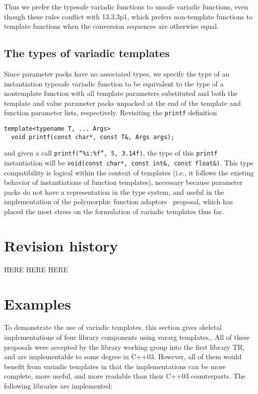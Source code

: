\documentclass{article}
\begin{document}
Thus we prefer the typesafe variadic functions to unsafe variadic
functions, even though these rules conflict with 13.3.3p1, which
prefers non-template functions to template functions when the
conversion sequences are otherwise equal.

\subsection{The types of variadic templates}
Since parameter packs have no associated types, we specify the
type of an instantiation typesafe variadic function to be equivalent
to the type of a nontemplate function with all template parameters
substituted and both the template and value parameter packs unpacked
at the end of the template and function parameter lists,
respectively. Revisiting the {\tt printf} definition

\begin{verbatim}
template<typename T, ... Args>
  void printf(const char*, const T&, Args args);
\end{verbatim}

and given a call {\tt printf(``\%i:\%f'', 5, 3.14f)}, the type of this
{\tt printf} instantiation will be {\tt void(const char*, const int\&,
  const float\&)}. This type compatibility is logical within the
context of templates (i.e., it follows the existing behavior of
instantiations of function templates), necessary because parameter
packs do not have a representation in the type system, and useful in the
implementation of the polymorphic function adaptors~\cite{Gregor02}
proposal, which has placed the most stress on the formulation of
variadic templates thus far.

\section{Revision history}
HERE HERE HERE

\section{Examples}
To demonstrate the use of variadic templates, this section gives
skeletal implementations of four library components using vararg
templates,. All of these proposals were accepted by the library
working group into the first library TR, and are implementable to some
degree in C++03. However, all of them would benefit from variadic
templates in that the implementations can be more complete, more
useful, and more readable than their C++03 counterparts. The following
libraries are implemented:
\end{document}

